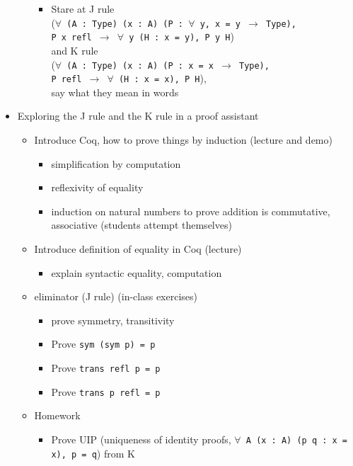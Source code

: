 \documentclass{article}
\begin{document}
\begin{itemize}
\begin{itemize}
\begin{itemize}
        \item Stare at J rule \\
          (\texttt{$\forall$~(A~:~Type) (x~:~A) (P~:~$\forall$ y, x = y $\to$ Type), \\ P x refl $\to$ $\forall$~y (H~:~x = y), P y H}) \\
          and K rule \\
          (\texttt{$\forall$~(A~:~Type) (x~:~A) (P~:~x = x $\to$ Type), \\ P refl $\to$ $\forall$~(H~:~x~=~x), P H}), \\
          say what they mean in words
      \end{itemize}
    \end{itemize}
    \item Exploring the J rule and the K rule in a proof assistant
    \begin{itemize}
      \item Introduce Coq, how to prove things by induction (lecture and demo)
      \begin{itemize}
        \item simplification by computation
        \item reflexivity of equality
        \item induction on natural numbers to prove addition is commutative, associative (students attempt themselves)
      \end{itemize}
      \item Introduce definition of equality in Coq (lecture)
      \begin{itemize}
        \item explain syntactic equality, computation
      \end{itemize}
      \item eliminator (J rule) (in-class exercises)
      \begin{itemize}
        \item prove symmetry, transitivity
        \item Prove \texttt{sym (sym p) = p}
        \item Prove \texttt{trans refl p = p}
        \item Prove \texttt{trans p refl = p}
      \end{itemize}
      \item Homework
      \begin{itemize}
        \item Prove UIP (uniqueness of identity proofs, \texttt{$\forall$ A (x~:~A) (p q~:~x = x), p = q}) from K

\end{itemize}
\end{itemize}
\end{itemize}
\end{document}
